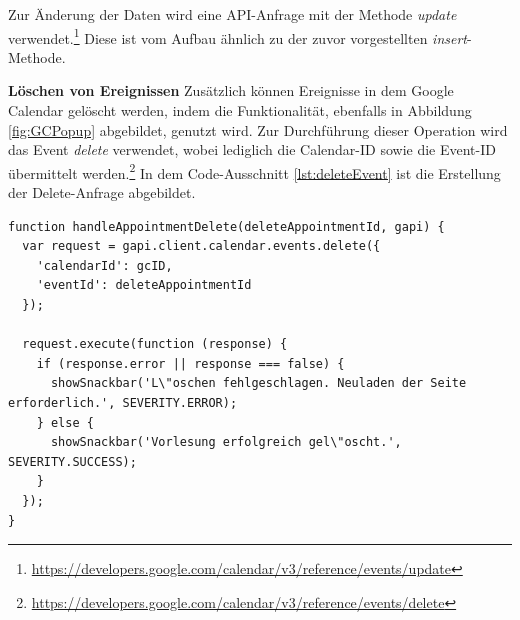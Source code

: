 Zur Änderung der Daten wird eine \ac{API}-Anfrage mit der Methode \textit{update} verwendet.\footnote{\url{https://developers.google.com/calendar/v3/reference/events/update}} 
Diese ist vom Aufbau ähnlich zu der zuvor vorgestellten \textit{insert}-Methode.

\textbf{Löschen von Ereignissen}\newline
Zusätzlich können Ereignisse in dem Google Calendar gelöscht werden, indem die Funktionalität, ebenfalls in Abbildung \vref{fig:GCPopup} abgebildet, genutzt wird. 
Zur Durchführung dieser Operation wird das Event \textit{delete} verwendet, wobei lediglich die Calendar-ID sowie die Event-ID übermittelt werden.\footnote{\url{https://developers.google.com/calendar/v3/reference/events/delete}}   
In dem Code-Ausschnitt \vref{lst:deleteEvent} ist die Erstellung der Delete-Anfrage abgebildet.

\lstset{language=JavaScript}
\begin{lstlisting}[caption={Anfrage zum Löschen eines Ereignisses}, label={lst:deleteEvent}]
function handleAppointmentDelete(deleteAppointmentId, gapi) {
  var request = gapi.client.calendar.events.delete({
    'calendarId': gcID,
    'eventId': deleteAppointmentId
  });

  request.execute(function (response) {
    if (response.error || response === false) {
      showSnackbar('L\"oschen fehlgeschlagen. Neuladen der Seite erforderlich.', SEVERITY.ERROR);
    } else {
      showSnackbar('Vorlesung erfolgreich gel\"oscht.', SEVERITY.SUCCESS);
    }
  });
}
\end{lstlisting}

